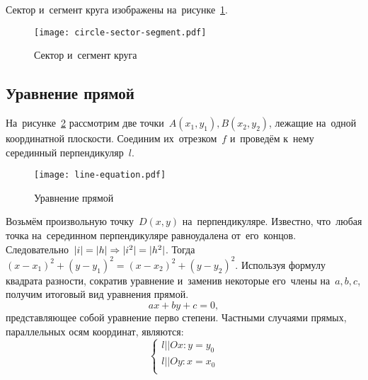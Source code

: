 \documentclass[]{scrartcl}
\begin{document}
Сектор и~сегмент круга изображены на~рисунке~\ref{fig:circle-sector-segment}.

\begin{figure}[ht]
	\centering %
	\texttt{[image: circle-sector-segment.pdf]}
	\caption{Сектор и~сегмент круга}\label{fig:circle-sector-segment}
\end{figure}


\subsection{Уравнение прямой}
На~рисунке~\ref{fig:line-equation} рассмотрим две точки~${\textstyle A(x_{1},y_{1}),B(x_{2},y_{2})}$, лежащие на~одной координатной плоскости. Соединим их~отрезком~${\textstyle f}$ и~проведём к~нему серединный перпендикуляр~${\textstyle l}$.
\begin{figure}[ht]
	\centering %
	\texttt{[image: line-equation.pdf]}
	\caption{Уравнение прямой}\label{fig:line-equation}
\end{figure}
Возьмём произвольную точку~${\textstyle D(x,y)}$ на~перпендикуляре. Известно, что~любая точка на~серединном перпендикуляре равноудалена от~его~концов. Следовательно~${\textstyle \arrowvert i \arrowvert=\arrowvert h \arrowvert \Rightarrow \arrowvert i^2 \arrowvert=\arrowvert h^2 \arrowvert}$. Тогда~${\textstyle (x-x_{1})^2+(y-y_1)^2=(x-x_{2})^2+(y-y_2)^2}$. Используя формулу квадрата разности, сократив уравнение и~заменив некоторые его~члены на~${\textstyle a,b,c}$, получим итоговый вид уравнения прямой.
\begin{equation}\label{eq:line-equation}
ax+by+c=0,
\end{equation}
представляющее собой уравнение перво степени. Частными случаями прямых, параллельных осям координат, являются:
\begin{equation}\label{eq:parallel-line-equations}
\begin{cases}
l||Ox:y=y_0\\
l||Oy:x=x_0\\
\end{cases}
\end{equation}
%
\end{document}
